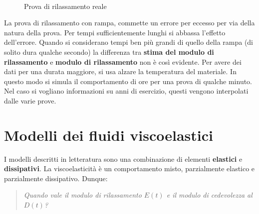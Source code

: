 \begin{figure}
\\
\caption{Prova di rilassamento reale}
\label{fig:ProvaRilassamento}		
\end{figure}

La prova di rilassamento con rampa, commette un errore per eccesso per via della natura della prova. Per tempi sufficientemente lunghi si abbassa l'effetto dell'errore.
Quando si considerano tempi ben più grandi di quello della rampa (di solito dura qualche secondo) la differenza tra \textbf{stima del modulo di rilassamento} e \textbf{modulo di rilassamento} non è così evidente.
Per avere dei dati per una durata maggiore, si usa alzare la temperatura del materiale. In questo modo si simula il comportamento di ore per una prova di qualche minuto.
Nel caso si vogliano informazioni su anni di esercizio, questi vengono interpolati dalle varie prove.

\chapter{Modelli dei fluidi viscoelastici}\label{chp:ModelliFluidi}
I modelli descritti in letteratura sono una combinazione di elementi \textbf{elastici} e \textbf{dissipativi}.
La viscoelasticità è un comportamento misto, parzialmente elastico e parzialmente dissipativo.
Dunque:
\begin{quote}
\emph{Quando vale il modulo di rilassamento $E(t)$ e il modulo di cedevolezza al  $D(t)$?}
\end{quote}

